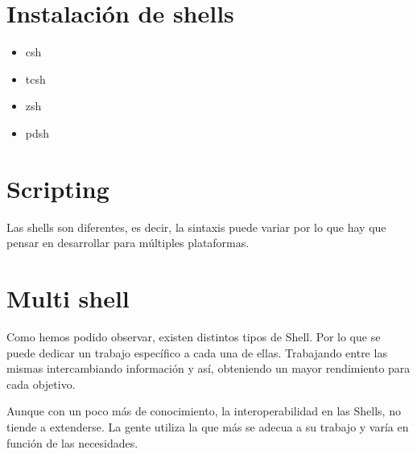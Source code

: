 \documentclass{scrartcl}
\begin{document}
\section{Instalaci\'on de shells}

\begin{itemize}
    \item csh
    \item tcsh
    \item zsh
    \item pdsh
\end{itemize}

\section{Scripting}

\par Las shells son diferentes, es decir, la sintaxis puede variar por lo que hay que pensar en desarrollar para m\'ultiples plataformas.

\section{Multi shell}

\par Como hemos podido observar, existen distintos tipos de Shell. Por lo que se puede dedicar un trabajo espec\'ifico a cada una de ellas. Trabajando entre las mismas intercambiando informaci\'on y as\'i, obteniendo un mayor rendimiento para cada objetivo.

\par Aunque con un poco m\'as de conocimiento, la interoperabilidad en las Shells, no tiende a extenderse. La gente utiliza la que m\'as se adecua a su trabajo y var\'ia en funci\'on de las necesidades.
\end{document}
